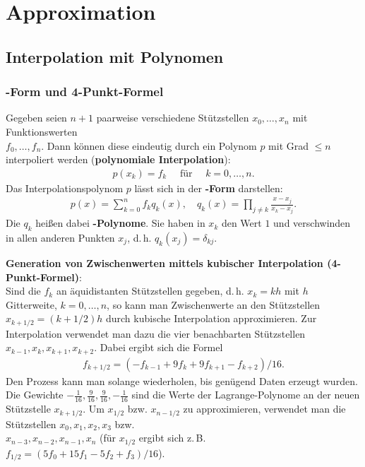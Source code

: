 \chapter{%
    Approximation%
}

\section{%
    Interpolation mit Polynomen%
}

\subsection{%
    -Form und 4-Punkt-Formel%
}

Gegeben seien $n + 1$ paarweise verschiedene Stützstellen $x_0, \dotsc, x_n$
mit Funktionswerten \\
$f_0, \dotsc, f_n$.
Dann können diese eindeutig durch ein Polynom $p$ mit Grad $\le n$ interpoliert
werden
(\textbf{polynomiale Interpolation}):
\begin{align*}
    p(x_k) = f_k \quad\text{ für }\quad k = 0, \dotsc, n.
\end{align*}
Das Interpolationspolynom $p$ lässt sich in der \textbf{-Form}
darstellen:
\begin{align*}
    p(x) = \sum_{k=0}^n f_k q_k(x), \quad
    q_k(x) = \prod_{j \not= k} \frac{x - x_j}{x_k - x_j}.
\end{align*}
Die $q_k$ heißen dabei \textbf{-Polynome}.
Sie haben in $x_k$ den Wert $1$ und verschwinden in allen anderen Punkten
$x_j$, d.\,h. $q_k(x_j) = \delta_{kj}$.

\linie

\textbf{Generation von Zwischenwerten mittels kubischer Interpolation
(4-Punkt-Formel)}: \\
Sind die $f_k$ an äquidistanten Stützstellen gegeben, d.\,h.
$x_k = kh$ mit $h$ Gitterweite, $k = 0, \dotsc, n$, so kann man
Zwischenwerte an den Stützstellen $x_{k + 1/2} = (k + 1/2)h$ durch kubische
Interpolation approximieren.
Zur Interpolation verwendet man dazu die vier benachbarten Stützstellen
$x_{k-1}, x_k, x_{k+1}, x_{k+2}$.
Dabei ergibt sich die Formel
\begin{align*}
    f_{k + 1/2} = (-f_{k-1} + 9f_k + 9f_{k+1} - f_{k+2}) / 16.
\end{align*}
Den Prozess kann man solange wiederholen, bis genügend Daten erzeugt wurden.
Die Gewichte $-\frac{1}{16}, \frac{9}{16}, \frac{9}{16}, -\frac{1}{16}$ sind
die Werte der Lagrange-Polynome an der neuen Stützstelle $x_{k + 1/2}$.
Um $x_{1/2}$ bzw. $x_{n - 1/2}$ zu approximieren, verwendet man die
Stützstellen $x_0, x_1, x_2, x_3$ bzw. \\
$x_{n-3}, x_{n-2}, x_{n-1}, x_n$
(für $x_{1/2}$ ergibt sich z.\,B. $f_{1/2} = (5f_0 + 15f_1- 5f_2 + f_3) / 16$).

